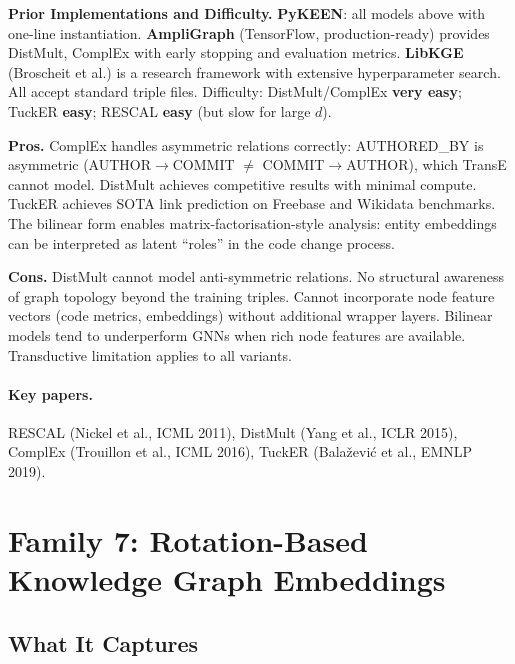 \documentclass[12pt,a4paper]{article}
\begin{document}
\begin{implbox}
\textbf{Prior Implementations and Difficulty.}
\textbf{PyKEEN}: all models above with one-line instantiation. \textbf{AmpliGraph}
(TensorFlow, production-ready) provides DistMult, ComplEx with early stopping and
evaluation metrics. \textbf{LibKGE} (Broscheit et al.) is a research framework
with extensive hyperparameter search. All accept standard triple files.
Difficulty: DistMult/ComplEx \textbf{very easy}; TuckER \textbf{easy};
RESCAL \textbf{easy} (but slow for large $d$).
\end{implbox}

\begin{prosbox}
\textbf{Pros.}
ComplEx handles asymmetric relations correctly: AUTHORED\_BY is asymmetric
(AUTHOR$\to$COMMIT $\neq$ COMMIT$\to$AUTHOR), which TransE cannot model.
DistMult achieves competitive results with minimal compute. TuckER achieves
SOTA link prediction on Freebase and Wikidata benchmarks. The bilinear form
enables matrix-factorisation-style analysis: entity embeddings can be
interpreted as latent ``roles'' in the code change process.
\end{prosbox}

\begin{consbox}
\textbf{Cons.}
DistMult cannot model anti-symmetric relations. No structural awareness of
graph topology beyond the training triples. Cannot incorporate node feature
vectors (code metrics, embeddings) without additional wrapper layers. Bilinear
models tend to underperform GNNs when rich node features are available.
Transductive limitation applies to all variants.
\end{consbox}

\paragraph{Key papers.} RESCAL (Nickel et al., ICML 2011), DistMult (Yang et al.,
ICLR 2015), ComplEx (Trouillon et al., ICML 2016), TuckER (Bala\v{z}evi\'{c}
et al., EMNLP 2019).

\section{Family 7: Rotation-Based Knowledge Graph Embeddings}

\subsection{What It Captures}
\end{document}
